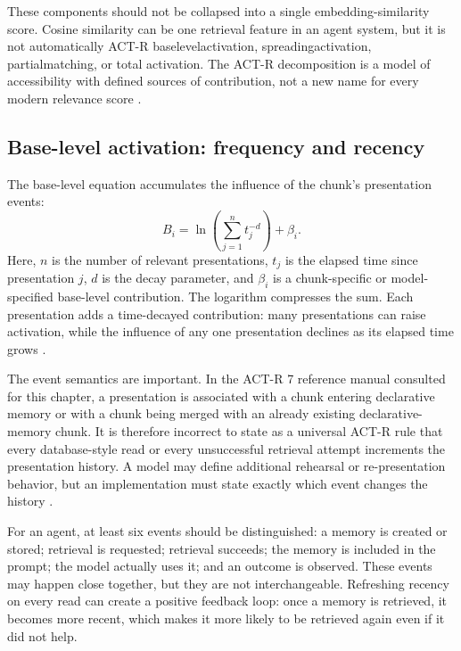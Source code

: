 These components should not be collapsed into a single embedding-similarity score. Cosine similarity can be one retrieval feature in an agent system, but it is not automatically ACT-R \gls{baselevelactivation}, \gls{spreadingactivation}, \gls{partialmatching}, or total activation. The ACT-R decomposition is a model of accessibility with defined sources of contribution, not a new name for every modern relevance score \autocite[pp. 263--267]{actr7manual}.

\subsection{Base-level activation: frequency and recency}
\label{subsec:ch12-base-level}

The base-level equation accumulates the influence of the chunk's presentation events:
\begin{equation}
  B_i = \ln\left(\sum_{j=1}^{n} t_j^{-d}\right)+\beta_i.
  \label{eq:ch12-base-level}
\end{equation}
Here, \(n\) is the number of relevant presentations, \(t_j\) is the elapsed time since presentation \(j\), \(d\) is the decay parameter, and \(\beta_i\) is a chunk-specific or model-specified base-level contribution. The logarithm compresses the sum. Each presentation adds a time-decayed contribution: many presentations can raise activation, while the influence of any one presentation declines as its elapsed time grows \autocite[p. 263]{actr7manual}.

The event semantics are important. In the ACT-R 7 reference manual consulted for this chapter, a presentation is associated with a chunk entering declarative memory or with a chunk being merged with an already existing declarative-memory chunk. It is therefore incorrect to state as a universal ACT-R rule that every database-style read or every unsuccessful retrieval attempt increments the presentation history. A model may define additional rehearsal or re-presentation behavior, but an implementation must state exactly which event changes the history \autocite[p. 263]{actr7manual}.

For an agent, at least six events should be distinguished: a memory is created or stored; retrieval is requested; retrieval succeeds; the memory is included in the prompt; the model actually uses it; and an outcome is observed. These events may happen close together, but they are not interchangeable. Refreshing recency on every read can create a positive feedback loop: once a memory is retrieved, it becomes more recent, which makes it more likely to be retrieved again even if it did not help.

